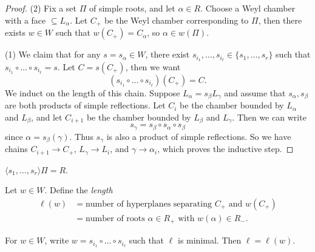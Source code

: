 \begin{proof}
  (2) Fix a set $\Pi$ of simple roots,
  and let $\alpha \in R$. Choose a
  Weyl chamber with a face $\subseteq L_\alpha$.
  Let $C_+$ be the Weyl chamber
  corresponding to $\Pi$, then
  there exists $w \in W$
  such that $w(C_+) = C_\alpha$,
  so $\alpha \in w(\Pi)$.

  (1) We claim that for any
  $s = s_\alpha \in W$,
  there exist $s_{i_1}, \dots, s_{i_\ell} \in \{s_1, \dots, s_r\}$
  such that
  $s_{i_1} \circ \dots \circ s_{i_\ell} = s$.
  Let $C = s(C_+)$, then we want
  \[
    (s_{i_1} \circ \dots \circ s_{i_\ell})(C_+) = C.
  \]
  We induct on the length of this chain.
  Suppose $L_\alpha = s_\beta L_\gamma$
  and
  assume that
  $s_\alpha, s_\beta$ are both
  products of simple reflections.
  Let $C_i$ be the chamber bounded
  by $L_\alpha$ and $L_\beta$, and
  let $C_{i + 1}$ be the chamber
  bounded by $L_\beta$ and $L_\gamma$.
  Then
  we can write
  \[
    s_\gamma
    = s_\beta \circ s_\alpha \circ s_\beta
  \]
  since $\alpha = s_\beta(\gamma)$.
  Thus $s_\gamma$ is also a product
  of simple reflections. So
  we have chains
  $C_{i + 1} \to C_+$,
  $L_\gamma \to L_i$, and
  $\gamma \to \alpha_i$, which
  proves the inductive step.
\end{proof}

\begin{corollary}
  $\langle s_1, \dots, s_r \rangle \Pi = R$.
\end{corollary}

\begin{definition}
  Let $w \in W$. Define the
  \emph{length}
  \begin{align*}
    \ell(w)
    &= \text{number of hyperplanes separating $C_+$ and $w(C_+)$} \\
    &= \text{number of roots $\alpha \in R_+$ with $w(\alpha) \in R_-$}.
  \end{align*}
\end{definition}

\begin{theorem}
  For $w \in W$, write
  $w = s_{i_1} \circ \dots \circ s_{i_\ell}$
  such that $\ell$ is minimal.
  Then $\ell = \ell(w)$.
\end{theorem}

